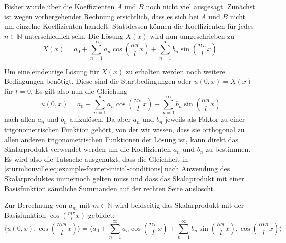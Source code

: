 Bisher wurde über die Koeffizienten $A$ und $B$ noch nicht viel ausgesagt.
Zunächst ist wegen vorhergehender Rechnung ersichtlich, dass es sich bei
$A$ und $B$ nicht um einzelne Koeffizienten handelt.
Stattdessen können die Koeffizienten für jedes $n \in \mathbb{N}$
unterschiedlich sein.
Die Lösung $X(x)$ wird nun umgeschrieben zu
\[
    X(x)
    =
    a_0
    +
    \sum_{n = 1}^{\infty} a_n\cos\left(\frac{n\pi}{l}x\right)
    +
    \sum_{n = 1}^{\infty} b_n\sin\left(\frac{n\pi}{l}x\right).
\]

Um eine eindeutige Lösung für $X(x)$ zu erhalten werden noch weitere
Bedingungen benötigt.
Diese sind die Startbedingungen oder $u(0, x) = X(x)$ für $t = 0$.
Es gilt also nun die Gleichung
\begin{equation}
    \label{sturmliouville:eq:example-fourier-initial-conditions}
    u(0, x)
    =
    a_0
    +
    \sum_{n = 1}^{\infty} a_n\cos\left(\frac{n\pi}{l}x\right)
    +
    \sum_{n = 1}^{\infty} b_n\sin\left(\frac{n\pi}{l}x\right)
\end{equation}
nach allen $a_n$ und $b_n$ aufzulösen.
Da aber $a_n$ und $b_n$ jeweils als Faktor zu einer trigonometrischen Funktion
gehört, von der wir wissen, dass sie orthogonal zu allen anderen
trigonometrischen Funktionen der Lösung ist, kann direkt das Skalarprodukt
verwendet werden um die Koeffizienten $a_n$ und $b_n$ zu bestimmen.
Es wird also die Tatsache ausgenutzt, dass die Gleichheit in
\eqref{sturmliouville:eq:example-fourier-initial-conditions} nach Anwendung des
Skalarproduktes immernoch gelten muss und dass das Skalaprodukt mit einer
Basisfunktion sämtliche Summanden auf der rechten Seite auslöscht.

Zur Berechnung von $a_m$ mit $ m \in \mathbb{N} $ wird beidseitig das
Skalarprodukt mit der Basisfunktion $ \cos\left(\frac{m \pi}{l}x\right)$
gebildet:
\begin{equation}
    \label{sturmliouville:eq:dot-product-cosine}
    \langle u(0, x), \cos\left(\frac{m \pi}{l}x\right) \rangle
    =
    \langle a_0
    +
    \sum_{n = 1}^{\infty} a_n\cos\left(\frac{n\pi}{l}x\right)
    +
    \sum_{n = 1}^{\infty} b_n\sin\left(\frac{n\pi}{l}x\right),
    \cos\left(\frac{m \pi}{l}x\right)\rangle
\end{equation}

